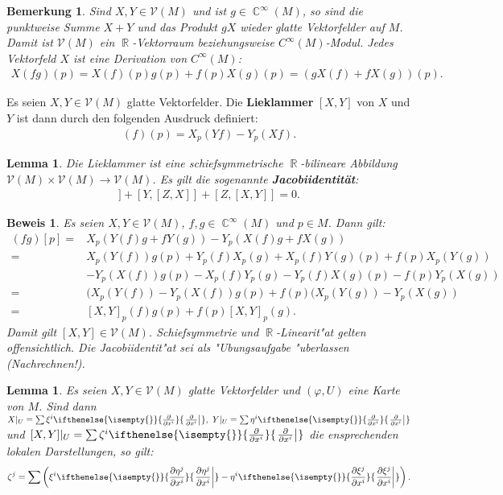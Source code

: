 \documentclass[paper=A4, twoside, chapterprefix=true, bibliography=totoc, headsepline]{scrbook}
\let\temp\phi
\let\phi\varphi
\let\varphi\temp
\let\temp\theta
\let\theta\vartheta
\let\vartheta\temp
\let\temp\epsilon
\let\epsilon\varepsilon
\let\varepsilon\temp
\let\temp\rho
\let\rho\varrho
\let\varrho\temp
\DeclareMathOperator{\C}{\mathbb{C}}
\DeclareMathOperator{\R}{\mathbb{R}}
\newcommand{\pdifffrac}[3][]{\ifthenelse{\isempty{#1}}{\frac{\partial #2}{\partial #3}}{\left. \frac{\partial #2}{\partial #3} \right|_{#1}}}
\theoremstyle{plain}
\newtheorem{Lemma}[Dfn]{Lemma}
\theoremstyle{nonumberplain}
\newtheorem{bem}{Bemerkung}
\newtheorem{bew}{Beweis}
\theoremstyle{empty}
\theoremstyle{break}
\newcommand{\CmIndex}[2][]{\ifthenelse{\isempty{#1}}{\index{#2}}{\index{#1}}#2}
\newcommand{\CmMark}[2][]{\textbf{\CmIndex[#1]{#2}}}
\begin{document}
\begin{bem}
  Sind $X,Y \in \mathcal V(M)$ und ist $g \in \C^{\infty}(M)$, so sind die punktweise Summe $X+Y$ und das Produkt $gX$ wieder glatte Vektorfelder auf $M$. Damit ist $\mathcal V(M)$ ein $\R$-Vektorraum beziehungsweise $C^{\infty}(M)$-Modul.
  Jedes Vektorfeld $X$ ist eine Derivation von $C^{\infty}(M)$:
  \begin{align*}
    X(fg)(p) = X(f)(p)g(p) + f(p) X(g)(p) = \left(gX(f) + fX(g)\right)(p).
  \end{align*}
\end{bem}

Es seien $X,Y \in \mathcal V(M)$ glatte Vektorfelder. Die \CmMark{Lieklammer} $[X,Y]$ von $X$ und $Y$ ist dann durch den folgenden Ausdruck definiert:
\begin{align*}
  [X,Y](f)(p) = X_p(Yf)-Y_p(Xf).
\end{align*}

\begin{Lemma}
  Die Lieklammer ist eine schiefsymmetrische $\R$-bilineare Abbildung $\mathcal V(M) \times \mathcal V(M) \to \mathcal V(M)$. Es gilt die sogenannte \CmMark{Jacobiidentit\"at}:
  \begin{align*}
    [X,[Y,Z]] + [Y,[Z,X]] + [Z,[X,Y]] = 0.
  \end{align*}
\end{Lemma}

\begin{bew}
  Es seien $X,Y \in \mathcal V(M)$, $f,g \in \C^{\infty}(M)$ und $p \in M$. Dann gilt:
  \begin{align*}
    [X,Y](fg)[p]  ={} & X_p(Y(f)g + fY(g)) - Y_p(X(f)g+fX(g))\\
    ={} & X_p(Y(f))g(p) + Y_p(f)X_p(g) + X_p(f)Y(g)(p) + f(p)X_p(Y(g))\\
    & - Y_p(X(f))g(p) - X_p(f)Y_p(g) - Y_p(f)X(g)(p) - f(p)Y_p(X(g))\\
    ={} & (X_p(Y(f))-Y_p(X(f))g(p) + f(p)(X_p(Y(g))-Y_p(X(g))\\
    ={} & [X,Y]_p (f)g(p) + f(p)[X,Y]_p(g).
  \end{align*}
  Damit gilt $[X,Y] \in \mathcal V(M)$. Schiefsymmetrie und $\R$-Linearit"at gelten offensichtlich. Die Jacobiidentit"at sei als "Ubungsaufgabe "uberlassen (Nachrechnen!).
\end{bew}


\begin{Lemma}
  Es seien $X,Y \in \mathcal V(M)$ glatte Vektorfelder und $(\phi,U)$ eine Karte von $M$.
  Sind dann $X|_U = \sum \xi^i\pdifffrac{}{x^i}, \ Y|_U = \sum \eta^i \pdifffrac{}{x^i}$ und $[X,Y]|_U = \sum \zeta^i \pdifffrac{}{x^i}$ die ensprechenden lokalen Darstellungen, so gilt:
  \begin{align*}
    \zeta^j = \sum \left(\xi^i\pdifffrac{\eta^j}{x^i} - \eta^i \pdifffrac{\xi^j}{x^i} \right).
  \end{align*}
\end{Lemma} 
\end{document}
